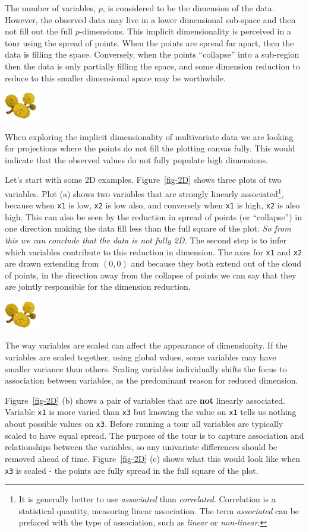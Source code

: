 \documentclass[
  letterpaper,
]{krantz}
\newcommand{\infobox}[1]{%
\noindent\colorbox{info!30}{%
\begin{minipage}{0.98\linewidth}%
    \centering%
    \begin{minipage}[c]{0.15\linewidth} %
      \includegraphics[width=1.5cm]{images/mulga-flowers2.png} %
    \end{minipage}%
    \hfill %
    \begin{minipage}[c]{0.8\linewidth} %
      \bigskip%
      \textsf{#1}%
      \bigskip%
    \end{minipage}%
    \hspace*{3mm}%
  \end{minipage}%
}%
}
\begin{document}
The number of variables, \(p\), is considered to be the dimension of the
data. However, the observed data may live in a lower dimensional
sub-space and then not fill out the full \(p\)-dimensions. This implicit
dimensionality is perceived in a tour using the spread of points. When
the points are spread far apart, then the data is filling the space.
Conversely, when the points ``collapse'' into a sub-region then the data
is only partially filling the space, and some dimension reduction to
reduce to this smaller dimensional space may be worthwhile.

\infobox{When exploring the implicit dimensionality of multivariate data we are looking for projections where the points do not fill the plotting canvas fully. This would indicate that the observed values do not fully populate high dimensions. }

Let's start with some 2D examples. Figure~\ref{fig-2D} shows three plots
of two variables. Plot (a) shows two variables that are strongly
linearly associated\footnote{It is generally better to use
  \emph{associated} than \emph{correlated}. Correlation is a statistical
  quantity, measuring linear association. The term \emph{associated} can
  be prefaced with the type of association, such as \emph{linear} or
  \emph{non-linear}.}, because when \texttt{x1} is low, \texttt{x2} is
low also, and conversely when \texttt{x1} is high, \texttt{x2} is also
high. This can also be seen by the reduction in spread of points (or
``collapse'') in one direction making the data fill less than the full
square of the plot. \emph{So from this we can conclude that the data is
not fully 2D.} The second step is to infer which variables contribute to
this reduction in dimension. The axes for \texttt{x1} and \texttt{x2}
are drawn extending from \((0,0)\) and because they both extend out of
the cloud of points, in the direction away from the collapse of points
we can say that they are jointly responsible for the dimension
reduction.

\infobox{The way variables are scaled can affect the appearance of dimensionity. If the variables are scaled together, using global values, some variables may have smaller variance than others. Scaling variables individually shifts the focus to association between variables, as the predominant reason for reduced dimension.}

Figure~\ref{fig-2D} (b) shows a pair of variables that are \textbf{not}
linearly associated. Variable \texttt{x1} is more varied than
\texttt{x3} but knowing the value on \texttt{x1} tells us nothing about
possible values on \texttt{x3}. Before running a tour all variables are
typically scaled to have equal spread. The purpose of the tour is to
capture association and relationships between the variables, so any
univariate differences should be removed ahead of time.
Figure~\ref{fig-2D} (c) shows what this would look like when \texttt{x3}
is scaled - the points are fully spread in the full square of the plot.
\end{document}
